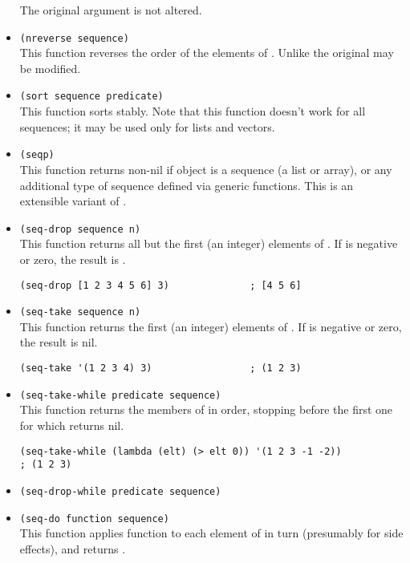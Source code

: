 \begin{itemize}
  The original argument  is not altered. 
\item \lstinline|(nreverse sequence)|\\
  This function reverses the order of the elements of .
  Unlike  the original  may be modified.
\item \lstinline|(sort sequence predicate)|\\
  This function sorts  stably.
  Note that this function doesn’t work for all sequences; it may be used only for lists and vectors.
\item \lstinline|(seqp)|\\
  This function returns non-nil if object is a sequence (a list or array), or any additional type of sequence defined via  generic functions.
  This is an extensible variant of .
\item \lstinline|(seq-drop sequence n)|\\
  This function returns all but the first  (an integer) elements of .
  If  is negative or zero, the result is .
\begin{lstlisting}
(seq-drop [1 2 3 4 5 6] 3)              ; [4 5 6]
\end{lstlisting}
\item \lstinline|(seq-take sequence n)|\\
  This function returns the first  (an integer) elements of .
  If  is negative or zero, the result is nil.
\begin{lstlisting}
(seq-take '(1 2 3 4) 3)                 ; (1 2 3)
\end{lstlisting}
\item \lstinline|(seq-take-while predicate sequence)|\\
  This function returns the members of  in order, stopping before the first one for which  returns nil.
\begin{lstlisting}
(seq-take-while (lambda (elt) (> elt 0)) '(1 2 3 -1 -2))
; (1 2 3)
\end{lstlisting}
\item \lstinline|(seq-drop-while predicate sequence)|
\item \lstinline|(seq-do function sequence)|\\
  This function applies function to each element of  in turn (presumably for side effects), and returns .

\end{itemize}
